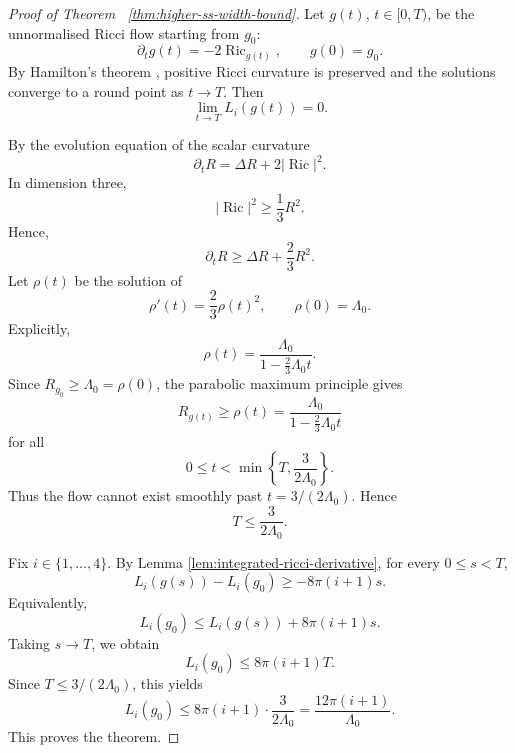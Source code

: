 \documentclass[12pt,english]{amsart}
\theoremstyle{definition}
\begin{document}
\begin{proof}[Proof of Theorem ~\ref{thm:higher-ss-width-bound}]
Let \(g(t)\), \(t\in[0,T)\), be the unnormalised Ricci flow starting from \(g_0\):
\[
\partial_t g(t)=-2\operatorname{Ric}_{g(t)},
\qquad
g(0)=g_0.
\]
By Hamilton's theorem \cite{H}, positive Ricci curvature is preserved and the solutions converge to a round point as \(t \to T\). Then
\[
\lim_{t\to T}L_i(g(t))=0.
\]

By the evolution equation of the scalar curvature
\[
\partial_t R=\Delta R+2|\operatorname{Ric}|^2.
\]
In dimension three,
\[
|\operatorname{Ric}|^2\ge \frac13R^2.
\]
Hence,
\[
\partial_t R\ge \Delta R+\frac23R^2.
\]
Let \(\rho(t)\) be the solution of
\[
\rho'(t)=\frac23\rho(t)^2,
\qquad
\rho(0)=\Lambda_0.
\]
Explicitly,
\[
\rho(t)
=
\frac{\Lambda_0}{1-\frac23\Lambda_0 t}.
\]
Since \(R_{g_0}\ge \Lambda_0=\rho(0)\), the parabolic maximum principle gives
\[
R_{g(t)}\ge \rho(t)
=
\frac{\Lambda_0}{1-\frac23\Lambda_0 t}
\]
for all
\[
0\le t<\min\left\{T,\frac{3}{2\Lambda_0}\right\}.
\]
Thus the flow cannot exist smoothly past \(t=3/(2\Lambda_0)\). Hence
\[
T\le \frac{3}{2\Lambda_0}.
\]

Fix \(i\in\{1,\ldots,4\}\). By Lemma \ref{lem:integrated-ricci-derivative}, for every
\(0\le s<T\),
\[
L_i(g(s))-L_i(g_0)
\ge
-8\pi(i+1)s.
\]
Equivalently,
\[
L_i(g_0)
\le
L_i(g(s))+8\pi(i+1)s.
\]
Taking \(s\to T\), we obtain
\[
L_i(g_0)
\le
8\pi(i+1)T.
\]
Since \(T\le 3/(2\Lambda_0)\), this yields
\[
L_i(g_0)
\le
8\pi(i+1)\cdot \frac{3}{2\Lambda_0}
=
\frac{12\pi(i+1)}{\Lambda_0}.
\]
This proves the theorem.
\end{proof}
\end{document}
